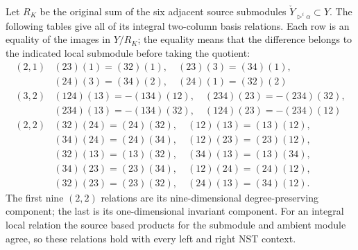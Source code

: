 Let $R_K$ be the original sum of the six adjacent source
submodules $\check Y_{\triangleright^i\alpha}\subset Y$.
The following tables give all of its integral two-column basis
relations. Each row is an equality of the images in $Y/R_K$;
the equality means that the difference belongs to the indicated
local submodule before taking the quotient:
\[
\begin{array}{c|l}
(2,1)&(23)(1)=(32)(1),\quad(23)(3)=(34)(1),\\
 &(24)(3)=(34)(2),\quad(24)(1)=(32)(2)\\\hline
(3,2)&(124)(13)=-(134)(12),\quad(234)(23)=-(234)(32),\\
 &(234)(13)=-(134)(32),\quad(124)(23)=-(234)(12)\\\hline
(2,2)&(32)(24)=(24)(32),\quad(12)(13)=(13)(12),\\
 &(34)(24)=(24)(34),\quad(12)(23)=(23)(12),\\
 &(32)(13)=(13)(32),\quad(34)(13)=(13)(34),\\
 &(34)(23)=(23)(34),\quad(12)(24)=(24)(12),\\
 &(32)(23)=(23)(32),\quad(24)(13)=(34)(12).
\end{array}
\]
The first nine $(2,2)$ relations are its nine-dimensional
degree-preserving component; the last is its one-dimensional
invariant component. For an integral local relation the source
based products for the submodule and ambient module agree, so
these relations hold with every left and right NST context.

